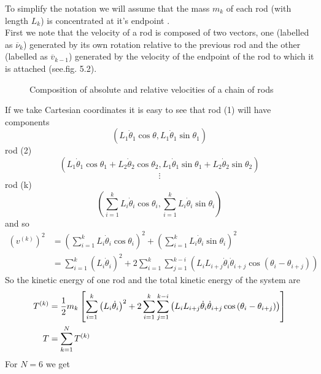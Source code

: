 To simplify the notation we will assume that the mass $m_k$ of each rod (with length $L_k$) is concentrated at it's endpoint .\\
First we note that the velocity of a rod is composed of two vectors, one (labelled as $\overline{\nu}_k$) generated by its own rotation relative to the previous rod and the other (labelled as $\overline{v}_{k-1}$) generated by the velocity of the endpoint of the rod to which it is attached (see.fig. 5.2).
\begin{figure}[H]
    \centering
    \subfloat[]{}
\caption{Composition of absolute and relative velocities of a chain of rods}
\label{fig:fig_p169_a}
\end{figure}
If we take Cartesian coordinates it is easy to see that rod (1) will have components $$\left( L_1\dot{\theta}_1\cos\theta,L_1\dot{\theta}_1\sin\theta_1\right)$$
rod (2) $$\left( L_1\dot{\theta}_1\cos\theta_1+ L_2\dot{\theta}_2\cos\theta_2 ,L_1\dot{\theta}_1\sin\theta_1+ L_2\dot{\theta}_2\sin\theta_2 \right)$$
$$\vdots$$
rod (k) $$\left( \sum_{i=1}^{k}L_i\dot{\theta}_i\cos\theta_i , \sum_{i=1}^{k}L_i\dot{\theta}_i\sin\theta_i  \right)$$
and so 
\begin{align}
\left(v^{(k)}\right)^2&= \left( \sum_{i=1}^{k}L_i\dot{\theta}_i\cos\theta_i\right)^2+\left( \sum_{i=1}^{k}L_i\dot{\theta}_i\sin\theta_i  \right)^2\\
&= \sum_{i=1}^{k}\left( L_i\dot{\theta}_i\right)^2+2\sum_{i=1}^{k}\sum_{j=1}^{k-i}\left( L_iL_{i+j}\dot{\theta}_i\dot{\theta}_{i+j}\cos\left(\theta_i -\theta_{i+j}\right) \right)
\end{align}
So the kinetic energy of one rod and the total kinetic energy of the system are
\begin{align}
T^{(k)}&= \frac{1}{2} m_k\left[\sum_{i=1}^{k}\left( L_i\dot{\theta}_i\right)^2+2\sum_{i=1}^{k}\sum_{j=1}^{k-i}\left( L_iL_{i+j}\dot{\theta}_i\dot{\theta}_{i+j}\cos\left(\theta_i -\theta_{i+j}\right) \right)\right]\\
T &= \sum_{k=1}^{N}T^{(k)}
\end{align}
For $N=6$ we get\\ \\

